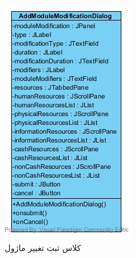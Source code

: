 \begin{figure}[H]
	\centering
	\begin{subfigure}[b]{0.3\textwidth}
	\includegraphics[width=\textwidth]{img/class-design/ui/AddModuleModificationDialog.jpg}
	\caption{کلاس ثبت تغییر ماژول}
	\end{subfigure}
	\begin{subfigure}[b]{0.3\textwidth}

\end{subfigure}
\end{figure}
